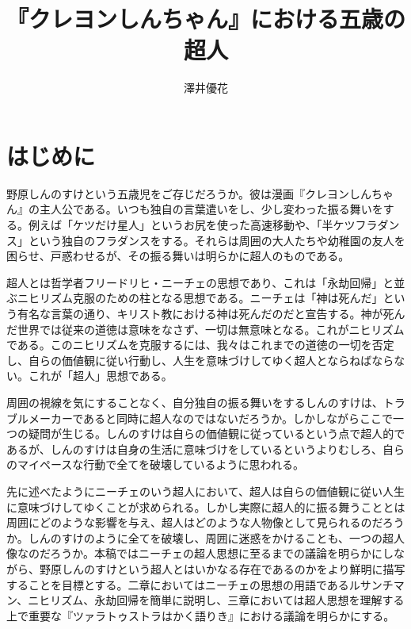\documentclass[b5j,twoside,twocolumn]{utarticle}
\title{\tbaselineshift =4.0pt 『クレヨンしんちゃん』における五歳の超人}
\author{澤井優花}
\date{\vspace{-5mm}}
\makeatletter
\def\yakuchu{%
\@ifnextchar[\@xfootnote %
{\stepcounter{yakuchu}%
\protected@xdef\@thefnmark{\theyakuchu}%
\@footnotemark\@footnotetext}}
\makeatother
\begin{document}
\maketitle

\setlength{\footskip}{-2mm}
\chead[]{}
\lfoot[]{\thepage{}}
\cfoot[]{}
\rfoot[\thepage{}]{}

\let\yakuchu=\endnote
\renewcommand{\footnoterule}{\noindent\rule{100mm}{0.3mm}\vskip2mm}
\thispagestyle{fancy}
\section{はじめに}
野原しんのすけという五歳児をご存じだろうか。彼は漫画『クレヨンしんちゃん』の主人公である。いつも独自の言葉遣いをし、少し変わった振る舞いをする。例えば「ケツだけ星人」というお尻を使った高速移動や、「半ケツフラダンス」という独自のフラダンスをする。それらは周囲の大人たちや幼稚園の友人を困らせ、戸惑わせるが、その振る舞いは明らかに超人のものである。


超人とは哲学者フリードリヒ・ニーチェの思想であり、これは「永劫回帰」と並ぶニヒリズム克服のための柱となる思想である。ニーチェは「神は死んだ」という有名な言葉の通り、キリスト教における神は死んだのだと宣告する。神が死んだ世界では従来の道徳は意味をなさず、一切は無意味となる。これがニヒリズムである。このニヒリズムを克服するには、我々はこれまでの道徳の一切を否定し、自らの価値観に従い行動し、人生を意味づけしてゆく超人とならねばならない。これが「超人」思想である。


周囲の視線を気にすることなく、自分独自の振る舞いをするしんのすけは、トラブルメーカーであると同時に超人なのではないだろうか。しかしながらここで一つの疑問が生じる。しんのすけは自らの価値観に従っているという点で超人的であるが、しんのすけは自身の生活に意味づけをしているというよりむしろ、自らのマイペースな行動で全てを破壊しているように思われる。


先に述べたようにニーチェのいう超人において、超人は自らの価値観に従い人生に意味づけしてゆくことが求められる。しかし実際に超人的に振る舞うこととは周囲にどのような影響を与え、超人はどのような人物像として見られるのだろうか。しんのすけのように全てを破壊し、周囲に迷惑をかけることも、一つの超人像なのだろうか。本稿ではニーチェの超人思想に至るまでの議論を明らかにしながら、野原しんのすけという超人とはいかなる存在であるのかをより鮮明に描写することを目標とする。二章においてはニーチェの思想の用語であるルサンチマン、ニヒリズム、永劫回帰を簡単に説明し、三章においては超人思想を理解する上で重要な『ツァラトゥストラはかく語りき』における議論を明らかにする。
\end{document}
